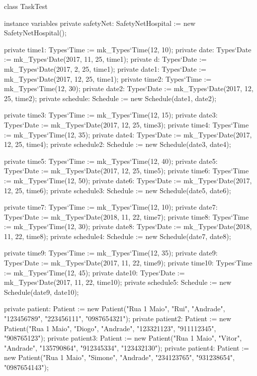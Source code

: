 \begin{vdmpp}[breaklines=true]
class TaskTest

instance variables
 private safetyNet: SafetyNetHospital := new SafetyNetHospital();
 
 private time1: Types`Time := mk_Types`Time(12, 10);
 private date: Types`Date := mk_Types`Date(2017, 11, 25, time1);
 private d: Types`Date := mk_Types`Date(2017, 2, 25, time1);
 private date1: Types`Date := mk_Types`Date(2017, 12, 25, time1);
 private time2: Types`Time := mk_Types`Time(12, 30);
 private date2: Types`Date := mk_Types`Date(2017, 12, 25, time2);
 private schedule: Schedule := new Schedule(date1, date2);
 
 private time3: Types`Time := mk_Types`Time(12, 15);
 private date3: Types`Date := mk_Types`Date(2017, 12, 25, time3);
 private time4: Types`Time := mk_Types`Time(12, 35);
 private date4: Types`Date := mk_Types`Date(2017, 12, 25, time4);
 private schedule2: Schedule := new Schedule(date3, date4);
 
 private time5: Types`Time := mk_Types`Time(12, 40);
 private date5: Types`Date := mk_Types`Date(2017, 12, 25, time5);
 private time6: Types`Time := mk_Types`Time(12, 50);
 private date6: Types`Date := mk_Types`Date(2017, 12, 25, time6);
 private schedule3: Schedule := new Schedule(date5, date6);
 
 private time7: Types`Time := mk_Types`Time(12, 10);
 private date7: Types`Date := mk_Types`Date(2018, 11, 22, time7);
 private time8: Types`Time := mk_Types`Time(12, 30);
 private date8: Types`Date := mk_Types`Date(2018, 11, 22, time8);
 private schedule4: Schedule := new Schedule(date7, date8);
 
 private time9: Types`Time := mk_Types`Time(12, 35);
 private date9: Types`Date := mk_Types`Date(2017, 11, 22, time9);
 private time10: Types`Time := mk_Types`Time(12, 45);
 private date10: Types`Date := mk_Types`Date(2017, 11, 22, time10);
 private schedule5: Schedule := new Schedule(date9, date10);
 
 private patient: Patient := new Patient("Rua 1 Maio", "Rui", "Andrade", "123456789", "223456111", "0987654321");
 private patient2: Patient := new Patient("Rua 1 Maio", "Diogo", "Andrade", "123321123", "911112345", "908765123");
 private patient3: Patient := new Patient("Rua 1 Maio", "Vitor", "Andrade", "135790864", "912345334", "123432130");
 private patient4: Patient := new Patient("Rua 1 Maio", "Simone", "Andrade", "234123765", "931238654", "0987654143"); 
  

\end{vdmpp}
